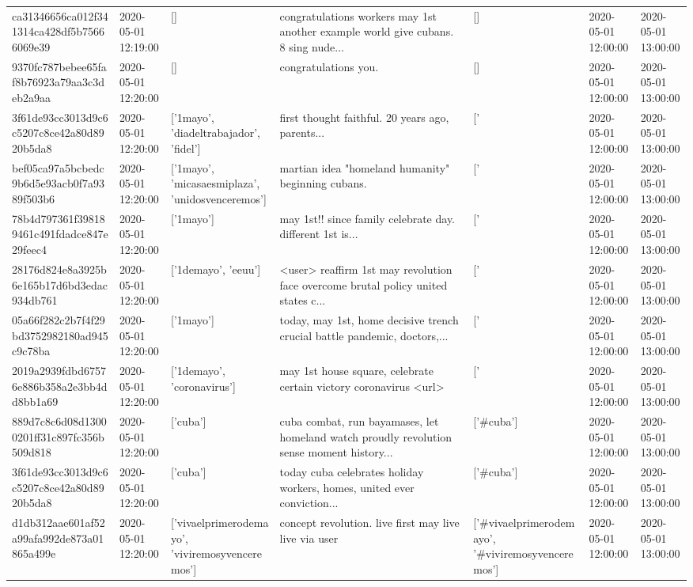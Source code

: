 \begin{tabular}{lllllll}
ca31346656ca012f341314ca428df5b75666069e39 & 2020-05-01 12:19:00 & [] & congratulations workers may 1st another example world give cubans. 8 sing nude... & [] & 2020-05-01 12:00:00 & 2020-05-01 13:00:00 \\
9370fc787bebee65faf8b76923a79aa3c3deb2a9aa & 2020-05-01 12:20:00 & [] & congratulations you. & [] & 2020-05-01 12:00:00 & 2020-05-01 13:00:00 \\
3f61de93cc3013d9c6c5207c8ce42a80d8920b5da8 & 2020-05-01 12:20:00 & ['1mayo', 'diadeltrabajador', 'fidel'] & first thought faithful. 2️0️ years ago, parents... & ['#1mayo', '#diadeltrabajador', '#fidel'] & 2020-05-01 12:00:00 & 2020-05-01 13:00:00 \\
bef05ca97a5bcbedc9b6d5e93acb0f7a9389f503b6 & 2020-05-01 12:20:00 & ['1mayo', 'micasaesmiplaza', 'unidosvenceremos'] & martian idea "homeland humanity" beginning cubans. & ['#1mayo', '#micasaesmiplaza', '#unidosvenceremos'] & 2020-05-01 12:00:00 & 2020-05-01 13:00:00 \\
78b4d797361f398189461c491fdadce847e29feec4 & 2020-05-01 12:20:00 & ['1mayo'] & may 1st!! since family celebrate day. different 1st is... & ['#1mayo'] & 2020-05-01 12:00:00 & 2020-05-01 13:00:00 \\
28176d824e8a3925b6e165b17d6bd3edac934db761 & 2020-05-01 12:20:00 & ['1demayo', 'eeuu'] & <user> reaffirm 1st may revolution face overcome brutal policy united states c... & ['#1demayo', '#eeuu'] & 2020-05-01 12:00:00 & 2020-05-01 13:00:00 \\
05a66f282c2b7f4f29bd3752982180ad945c9c78ba & 2020-05-01 12:20:00 & ['1mayo'] & today, may 1st, home decisive trench crucial battle pandemic, doctors,... & ['#1mayo'] & 2020-05-01 12:00:00 & 2020-05-01 13:00:00 \\
2019a2939fdbd67576e886b358a2e3bb4dd8bb1a69 & 2020-05-01 12:20:00 & ['1demayo', 'coronavirus'] & may 1st house square, celebrate certain victory coronavirus <url> & ['#1demayo', '#coronavirus'] & 2020-05-01 12:00:00 & 2020-05-01 13:00:00 \\
889d7c8c6d08d13000201ff31c897fc356b509d818 & 2020-05-01 12:20:00 & ['cuba'] & cuba combat, run bayamases, let homeland watch proudly revolution sense moment history... & ['#cuba'] & 2020-05-01 12:00:00 & 2020-05-01 13:00:00 \\
3f61de93cc3013d9c6c5207c8ce42a80d8920b5da8 & 2020-05-01 12:20:00 & ['cuba'] & today cuba celebrates holiday workers, homes, united ever conviction... & ['#cuba'] & 2020-05-01 12:00:00 & 2020-05-01 13:00:00 \\
d1db312aae601af52a99afa992de873a01865a499e & 2020-05-01 12:20:00 & ['vivaelprimerodemayo', 'viviremosyvenceremos'] & concept revolution. live first may live live via user & ['#vivaelprimerodemayo', '#viviremosyvenceremos'] & 2020-05-01 12:00:00 & 2020-05-01 13:00:00 \\

\end{tabular}
